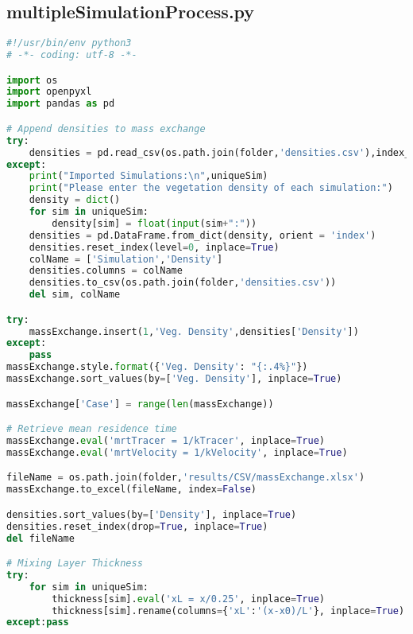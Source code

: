 \subsection{multipleSimulationProcess.py}
\begin{lstlisting}[language=python]
#!/usr/bin/env python3
# -*- coding: utf-8 -*-

import os
import openpyxl
import pandas as pd

# Append densities to mass exchange
try:
    densities = pd.read_csv(os.path.join(folder,'densities.csv'),index_col=0)
except:
    print("Imported Simulations:\n",uniqueSim)
    print("Please enter the vegetation density of each simulation:")
    density = dict()
    for sim in uniqueSim:
        density[sim] = float(input(sim+":"))
    densities = pd.DataFrame.from_dict(density, orient = 'index')
    densities.reset_index(level=0, inplace=True)
    colName = ['Simulation','Density']
    densities.columns = colName
    densities.to_csv(os.path.join(folder,'densities.csv'))
    del sim, colName

try:
    massExchange.insert(1,'Veg. Density',densities['Density'])
except:
    pass
massExchange.style.format({'Veg. Density': "{:.4%}"})
massExchange.sort_values(by=['Veg. Density'], inplace=True)

massExchange['Case'] = range(len(massExchange))

# Retrieve mean residence time
massExchange.eval('mrtTracer = 1/kTracer', inplace=True)
massExchange.eval('mrtVelocity = 1/kVelocity', inplace=True)

fileName = os.path.join(folder,'results/CSV/massExchange.xlsx')
massExchange.to_excel(fileName, index=False)

densities.sort_values(by=['Density'], inplace=True)
densities.reset_index(drop=True, inplace=True)
del fileName

# Mixing Layer Thickness
try:
    for sim in uniqueSim:
        thickness[sim].eval('xL = x/0.25', inplace=True)
        thickness[sim].rename(columns={'xL':'(x-x0)/L'}, inplace=True)
except:pass

\end{lstlisting}

